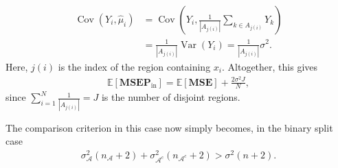 \documentclass{article}
\theoremstyle{definition}
\theoremstyle{remark}
\newcommand{\E }{\mathbb{E}}  %
\newcommand{\Cov}{\operatorname{Cov}}  %
\newcommand{\Var}{\operatorname{Var}}  %
\newcommand{\MSEPin}{\textbf{MSEP}_{\text{in}}}
\newcommand{\MSE}{\textbf{MSE}}
\begin{document}
\begin{align}
	\Cov \left(Y_i,  \widehat\mu_i \right) & = \Cov \left(Y_i, \frac{1}{|A_{j(i)}|}\sum_{k \in A_{j(i)}}
	Y_k\right)                                                                                           \\
	                                       & =\frac{1}{|A_{j(i)}|}\Var \left(Y_i\right)
	= \frac{1}{|A_{j(i)}|} \sigma^2.
\end{align}
Here, $j(i)$ is the index of the region containing $x_i$. Altogether, this gives
\begin{align*}
	\label{eq:msep_mse_op}
	\E[\MSEPin] = \E[\MSE] +  \frac{2 \sigma^2 J}{N},
\end{align*}
since $\sum_{i = 1}^N \frac{1}{|A_{j(i)}|} = J$ is the number of disjoint regions.



The comparison criterion in
this case now simply becomes, in the binary split case
\begin{align}
	\sigma_{\mathcal{A}}^2 (n_{\mathcal{A}} + 2) + \sigma_{\mathcal{A}^c}^2
	(n_{\mathcal{A}^c} + 2 ) > \sigma^2 (n + 2).
\end{align}
\end{document}
